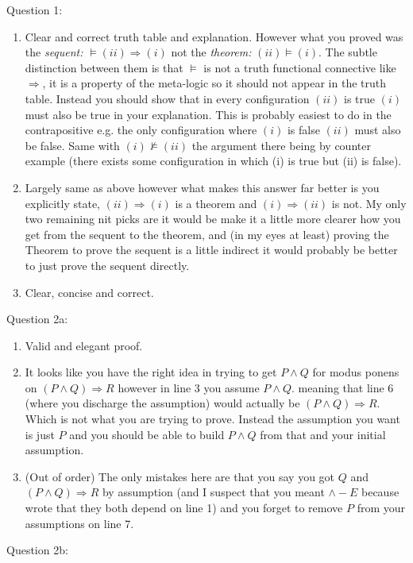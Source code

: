 \documentclass[11pt] {article}
\begin{document}
\noindent Question 1:
\begin{enumerate}
\item
Clear and correct truth table and explanation. However what you proved was the \textit{sequent:} $\vDash (ii) \Rightarrow (i)$ not the \textit{theorem:} $(ii) \vDash (i)$. The subtle distinction between them is that $\vDash$ is not a truth functional connective like $\Rightarrow$, it is a property of the meta-logic so it should not appear in the truth table. Instead you should show that in every configuration $(ii)$ is true $(i)$ must also be true in your explanation. This is probably easiest to do in the contrapositive e.g. the only configuration where $(i)$ is false $(ii)$ must also be false. Same with $(i) \nvDash (ii)$ the argument there being by counter example (there exists some configuration in which (i) is true but (ii) is false).
\item
Largely same as above however what makes this answer far better is you explicitly state, $(ii) \Rightarrow (i)$ is a theorem and $(i)\Rightarrow (ii)$ is not. My only two remaining nit picks are it would be make it a little more clearer how you get from the sequent to the theorem, and (in my eyes at least) proving the Theorem to prove the sequent is a little indirect it would probably be better to just prove the sequent directly.
\item 
Clear, concise and correct.
\end{enumerate}
Question 2a:
\begin{enumerate}
\item
Valid and elegant proof.
\item
It looks like you have the right idea in trying to get $P \land Q$ for modus ponens on $ (P\land Q) \Rightarrow R$ however in line 3 you assume $P \land Q$. meaning that line 6 (where you discharge the assumption) would actually be $(P \land Q) \Rightarrow R $. Which is not what you are trying to prove. Instead the assumption you want is just $P$ and you should be able to build $P \land Q$ from that and your initial assumption.
\item (Out of order) The only mistakes here are that you say you got $Q$ and $(P\land Q) \Rightarrow R$ by assumption (and I suspect that you meant $\land-E$ because wrote that they both depend on line 1) and you forget to remove $P$ from your assumptions on line 7.
\end{enumerate}
Question 2b:
\end{document}
